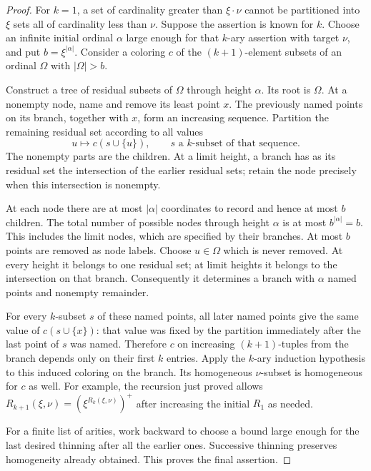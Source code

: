 \begin{proof}
For $k=1$, a set of cardinality greater than $\xi\cdot\nu$ cannot be
partitioned into $\xi$ sets all of cardinality less than $\nu$.
Suppose the assertion is known for $k$. Choose an infinite initial
ordinal $\alpha$ large enough for that $k$-ary assertion with target
$\nu$, and put $b=\xi^{|\alpha|}$. Consider a coloring $c$ of the
$(k+1)$-element subsets of an ordinal $\Omega$ with $|\Omega|>b$.

Construct a tree of residual subsets of $\Omega$ through height
$\alpha$. Its root is $\Omega$. At a nonempty node, name and remove
its least point $x$. The previously named points on its branch,
together with $x$, form an increasing sequence. Partition the
remaining residual set according to all values
\[
u\longmapsto c(s\cup\{u\}),
\qquad
s\text{ a $k$-subset of that sequence}.
\]
The nonempty parts are the children. At a limit height, a branch has
as its residual set the intersection of the earlier residual sets;
retain the node precisely when this intersection is nonempty.

At each node there are at most $|\alpha|$ coordinates to record and
hence at most $b$ children. The total number of possible nodes
through height $\alpha$ is at most
$b^{|\alpha|}=b$. This includes the limit nodes, which are specified
by their branches. At most $b$ points are removed as node labels.
Choose $u\in\Omega$ which is never removed. At every height it
belongs to one residual set; at limit heights it belongs to the
intersection on that branch. Consequently it determines a branch
with $\alpha$ named points and nonempty remainder.

For every $k$-subset $s$ of these named points, all later named points
give the same value of $c(s\cup\{x\})$: that value was fixed by the
partition immediately after the last point of $s$ was named.
Therefore $c$ on increasing $(k+1)$-tuples from the branch depends
only on their first $k$ entries. Apply the $k$-ary induction
hypothesis to this induced coloring on the branch. Its homogeneous
$\nu$-subset is homogeneous for $c$ as well. For example, the
recursion just proved allows
$R_{k+1}(\xi,\nu)=(\xi^{R_k(\xi,\nu)})^+$ after increasing the
initial $R_1$ as needed.

For a finite list of arities, work backward to choose a bound large
enough for the last desired thinning after all the earlier ones.
Successive thinning preserves homogeneity already obtained. This
proves the final assertion.
\end{proof}

